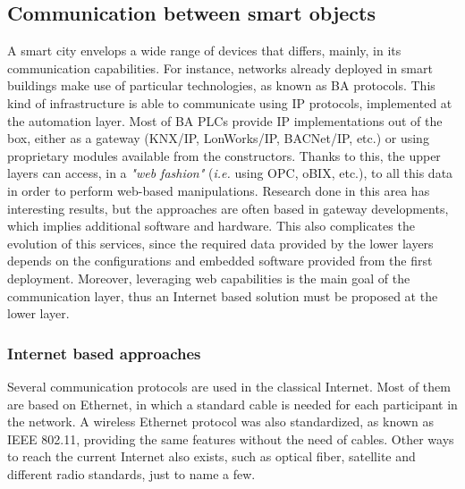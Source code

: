 \subsection{Communication between smart objects}
A smart city envelops a wide range of devices that differs, mainly, in its communication capabilities.
For instance, networks already deployed in smart buildings make use of particular technologies, as known as BA protocols.
This kind of infrastructure is able to communicate using IP protocols, implemented at the automation layer.
Most of BA PLCs provide IP implementations out of the box, either as a gateway (KNX/IP, LonWorks/IP, BACNet/IP, etc.)\cite{kastner2005commbas} or using proprietary modules available from the constructors.
Thanks to this, the upper layers can access, in a \textit{"web fashion"} (\textit{i.e.} using OPC, oBIX, etc.)\cite{neugschwandtner2007knxtoobix}, to all this data in order to perform web-based manipulations.
Research done in this area has interesting results\cite{jung2013bainsmartcities}, but the approaches are often based in gateway developments, which implies additional software and hardware.
This also complicates the evolution of this services, since the required data provided by the lower layers depends on the configurations and embedded software provided from the first deployment.
Moreover, leveraging web capabilities is the main goal of the communication layer, thus an Internet based solution must be proposed at the lower layer.

\subsubsection{Internet based approaches}
Several communication protocols are used in the classical Internet.
Most of them are based on Ethernet\cite{ieee802.3}, in which a standard cable is needed for each participant in the network.
A wireless Ethernet protocol was also standardized, as known as IEEE 802.11\cite{ieee802.11}, providing the same features without the need of cables.
Other ways to reach the current Internet also exists, such as optical fiber, satellite and different radio standards, just to name a few.

